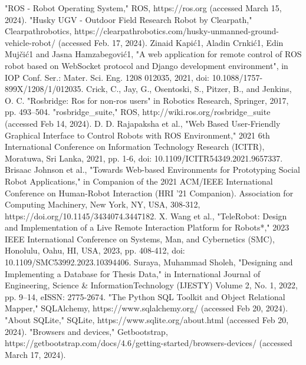 \documentclass[conference]{IEEEtran}
\begin{document}
\begin{thebibliography}{00}
"ROS - Robot Operating System," ROS, https://ros.org (accessed March 15, 2024).
"Husky UGV - Outdoor Field Research Robot by Clearpath," Clearpathrobotics, https://clearpathrobotics.com/husky-unmanned-ground-vehicle-robot/ (accessed Feb. 17, 2024).
 Zinaid Kapić1, Aladin Crnkić1, Edin Mujčić1 and Jasna Hamzabegović1, "A web application for remote control of ROS robot based on WebSocket protocol and Django development environment", in IOP Conf. Ser.: Mater. Sci. Eng. 1208 012035, 2021, doi: 10.1088/1757-899X/1208/1/012035.
 Crick, C., Jay, G., Osentoski, S., Pitzer, B., and Jenkins, O. C. "Rosbridge: Ros for non-ros users" in Robotics Research, Springer, 2017, pp. 493--504.
"rosbridge\_suite," ROS, http://wiki.ros.org/rosbridge\_suite (accessed Feb 14, 2024).
 D. D. Rajapaksha et al., "Web Based User-Friendly Graphical Interface to Control Robots with ROS Environment," 2021 6th International Conference on Information Technology Research (ICITR), Moratuwa, Sri Lanka, 2021, pp. 1-6, doi: 10.1109/ICITR54349.2021.9657337.
Brisaac Johnson et al., "Towards Web-based Environments for Prototyping Social Robot Applications," in Companion of the 2021 ACM/IEEE International Conference on Human-Robot Interaction (HRI '21 Companion). Association for Computing Machinery, New York, NY, USA, 308-312, https://doi.org/10.1145/3434074.3447182.
X. Wang et al., "TeleRobot: Design and Implementation of a Live Remote Interaction Platform for Robots*," 2023 IEEE International Conference on Systems, Man, and Cybernetics (SMC), Honolulu, Oahu, HI, USA, 2023, pp. 408-412, doi: 10.1109/SMC53992.2023.10394406.
 Suraya, Muhammad Sholeh, "Designing and Implementing a Database for Thesis Data," in International Journal of Engineering, Science \& InformationTechnology (IJESTY) Volume 2, No. 1, 2022, pp. 9--14, eISSN: 2775-2674.
"The Python SQL Toolkit and Object Relational Mapper," SQLAlchemy, https://www.sqlalchemy.org/ (accessed Feb 20, 2024).
"About SQLite," SQLite, https://www.sqlite.org/about.html (accessed Feb 20, 2024).
"Browsers and devices," Getbootstrap, https://getbootstrap.com/docs/4.6/getting-started/browsers-devices/ (accessed March 17, 2024).
\end{thebibliography}
\vspace{12pt}
\end{document}
